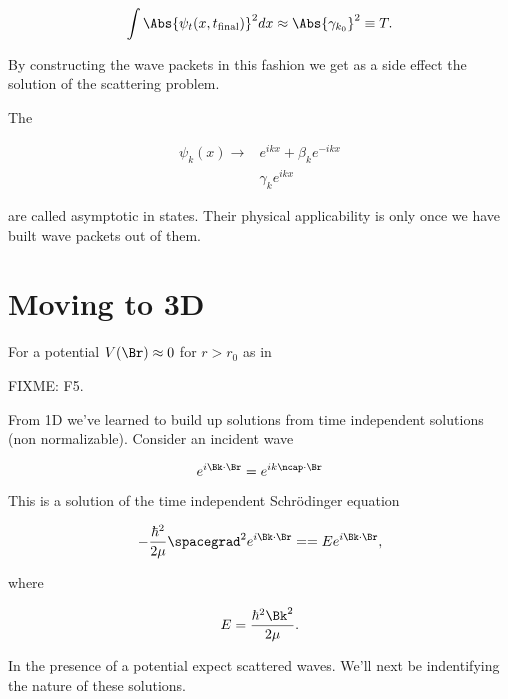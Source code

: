 \begin{equation}\label{eqn:qmTwoL22:490}
\int \Abs{\psi_t(x, t_{\text{final}})}^2 dx
\approx \Abs{\gamma_{k_0}}^2 \equiv T.
\end{equation}

By constructing the wave packets in this fashion we get as a side effect the solution of the scattering problem.

The 

\begin{align*}
\psi_k(x) \rightarrow & e^{i k x} + \beta_k e^{-i k x} \\
& \gamma_k e^{i k x} 
\end{align*}

are called asymptotic in states.  Their physical applicability is only once we have built wave packets out of them.

\section{Moving to 3D}

For a potential $V(\Br) \approx 0$ for $r > r_0$ as in 

FIXME: F5.

From 1D we've learned to build up solutions from time independent solutions (non normalizable).  Consider an incident wave

\begin{equation}\label{eqn:qmTwoL22:510}
e^{i \Bk \cdot \Br} = e^{i k \ncap \cdot \Br}
\end{equation}

This is a solution of the time independent Schr\"{o}dinger equation

\begin{equation}\label{eqn:qmTwoL22:530}
-\frac{\hbar^2}{2 \mu} \spacegrad^2 e^{i \Bk \cdot \Br} = 
= E 
e^{i \Bk \cdot \Br},
\end{equation}

where 

\begin{equation}\label{eqn:qmTwoL22:550}
E = \frac{\hbar^2 \Bk^2}{2 \mu}.
\end{equation}

In the presence of a potential expect scattered waves.  We'll next be indentifying the nature of these solutions.


\EndArticle
